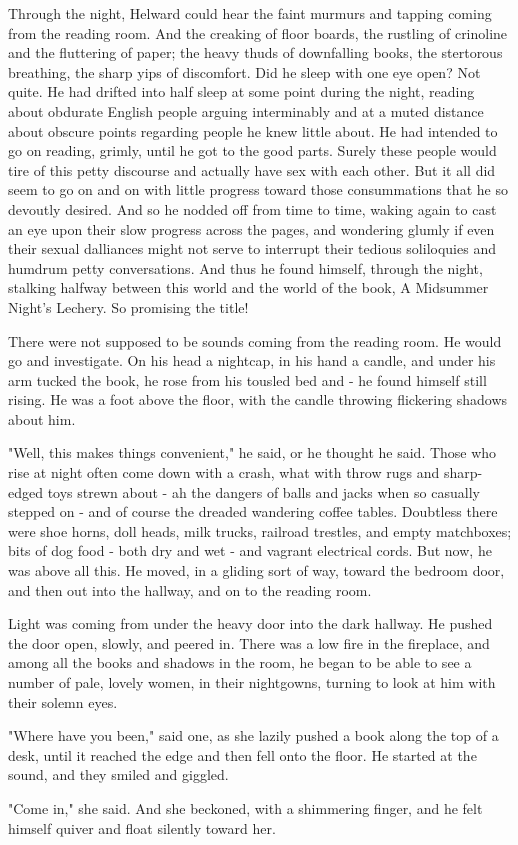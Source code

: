 Through the night, Helward could hear the faint murmurs and tapping
coming from the reading room. And the creaking of floor boards, the
rustling of crinoline and the fluttering of paper; the heavy thuds of
downfalling books, the stertorous breathing, the sharp yips of
discomfort. Did he sleep with one eye open? Not quite. He had drifted
into half sleep at some point during the night, reading about obdurate
English people arguing interminably and at a muted distance about
obscure points regarding people he knew little about. He had intended to
go on reading, grimly, until he got to the good parts. Surely these
people would tire of this petty discourse and actually have sex with
each other. But it all did seem to go on and on with little progress
toward those consummations that he so devoutly desired. And so he nodded
off from time to time, waking again to cast an eye upon their slow
progress across the pages, and wondering glumly if even their sexual
dalliances might not serve to interrupt their tedious soliloquies and
humdrum petty conversations. And thus he found himself, through the
night, stalking halfway between this world and the world of the book, A
Midsummer Night's Lechery. So promising the title!

There were not supposed to be sounds coming from the reading room. He
would go and investigate. On his head a nightcap, in his hand a candle,
and under his arm tucked the book, he rose from his tousled bed and - he
found himself still rising. He was a foot above the floor, with the
candle throwing flickering shadows about him.

"Well, this makes things convenient," he said, or he thought he said.
Those who rise at night often come down with a crash, what with throw
rugs and sharp-edged toys strewn about - ah the dangers of balls and
jacks when so casually stepped on - and of course the dreaded wandering
coffee tables. Doubtless there were shoe horns, doll heads, milk trucks,
railroad trestles, and empty matchboxes; bits of dog food - both dry and
wet - and vagrant electrical cords. But now, he was above all this. He
moved, in a gliding sort of way, toward the bedroom door, and then out
into the hallway, and on to the reading room.

Light was coming from under the heavy door into the dark hallway. He
pushed the door open, slowly, and peered in. There was a low fire in the
fireplace, and among all the books and shadows in the room, he began to
be able to see a number of pale, lovely women, in their nightgowns,
turning to look at him with their solemn eyes.

"Where have you been," said one, as she lazily pushed a book along the
top of a desk, until it reached the edge and then fell onto the floor.
He started at the sound, and they smiled and giggled.

"Come in," she said. And she beckoned, with a shimmering finger, and he
felt himself quiver and float silently toward her.

